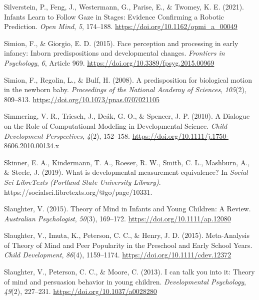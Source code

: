 \documentclass[
]{scrbook}
\newlength{\cslhangindent}
\newenvironment{CSLReferences}[2] %
 {\begin{list}{}{%
  \setlength{\itemindent}{0pt}
  \setlength{\leftmargin}{0pt}
  \setlength{\parsep}{0pt}
  \ifodd #1
   \setlength{\leftmargin}{\cslhangindent}
   \setlength{\itemindent}{-1\cslhangindent}
  \fi
  \setlength{\itemsep}{#2\baselineskip}}}
 {\end{list}}
\begin{document}
\begin{CSLReferences}{1}{0}
Silverstein, P., Feng, J., Westermann, G., Parise, E., \& Twomey, K. E. (2021). Infants {Learn} to {Follow Gaze} in {Stages}: {Evidence Confirming} a {Robotic Prediction}. \emph{Open Mind}, \emph{5}, 174--188. \url{https://doi.org/10.1162/opmi_a_00049}

Simion, F., \& Giorgio, E. D. (2015). Face perception and processing in early infancy: Inborn predispositions and developmental changes. \emph{Frontiers in Psychology}, \emph{6}, Article 969. \url{https://doi.org/10.3389/fpsyg.2015.00969}

Simion, F., Regolin, L., \& Bulf, H. (2008). A predisposition for biological motion in the newborn baby. \emph{Proceedings of the National Academy of Sciences}, \emph{105}(2), 809--813. \url{https://doi.org/10.1073/pnas.0707021105}

Simmering, V. R., Triesch, J., Deák, G. O., \& Spencer, J. P. (2010). A {Dialogue} on the {Role} of {Computational Modeling} in {Developmental Science}. \emph{Child Development Perspectives}, \emph{4}(2), 152--158. \url{https://doi.org/10.1111/j.1750-8606.2010.00134.x}

Skinner, E. A., Kindermann, T. A., Roeser, R. W., Smith, C. L., Mashburn, A., \& Steele, J. (2019). What is developmental measurement equivalence? In \emph{Social Sci LibreTexts (Portland State University Library)}. https://socialsci.libretexts.org/@go/page/10331.

Slaughter, V. (2015). Theory of {Mind} in {Infants} and {Young Children}: {A Review}. \emph{Australian Psychologist}, \emph{50}(3), 169--172. \url{https://doi.org/10.1111/ap.12080}

Slaughter, V., Imuta, K., Peterson, C. C., \& Henry, J. D. (2015). Meta-{Analysis} of {Theory} of {Mind} and {Peer Popularity} in the {Preschool} and {Early School Years}. \emph{Child Development}, \emph{86}(4), 1159--1174. \url{https://doi.org/10.1111/cdev.12372}

Slaughter, V., Peterson, C. C., \& Moore, C. (2013). I can talk you into it: {Theory} of mind and persuasion behavior in young children. \emph{Developmental Psychology}, \emph{49}(2), 227--231. \url{https://doi.org/10.1037/a0028280}


\end{CSLReferences}
\end{document}
